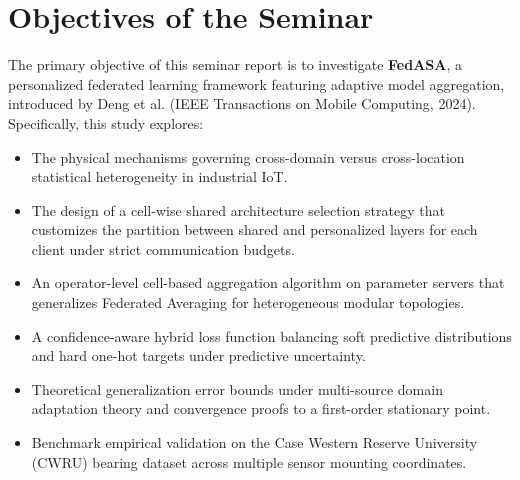\documentclass[12pt,a4paper]{report}
\begin{document}
\section{Objectives of the Seminar}
The primary objective of this seminar report is to investigate \textbf{FedASA}, a personalized federated learning framework featuring adaptive model aggregation, introduced by Deng et al. (IEEE Transactions on Mobile Computing, 2024). Specifically, this study explores:
\begin{itemize}
    \item The physical mechanisms governing cross-domain versus cross-location statistical heterogeneity in industrial IoT.
    \item The design of a cell-wise shared architecture selection strategy that customizes the partition between shared and personalized layers for each client under strict communication budgets.
    \item An operator-level cell-based aggregation algorithm on parameter servers that generalizes Federated Averaging for heterogeneous modular topologies.
    \item A confidence-aware hybrid loss function balancing soft predictive distributions and hard one-hot targets under predictive uncertainty.
    \item Theoretical generalization error bounds under multi-source domain adaptation theory and convergence proofs to a first-order stationary point.
    \item Benchmark empirical validation on the Case Western Reserve University (CWRU) bearing dataset across multiple sensor mounting coordinates.
\end{itemize}
\end{document}
